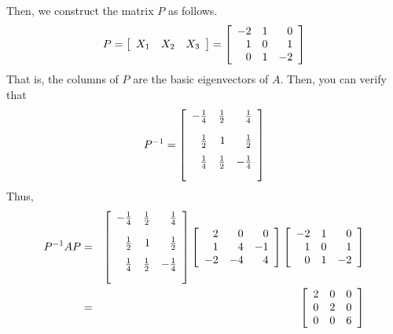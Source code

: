 \begin{solution}
Then, we construct the matrix $P$ as follows. 
\begin{equation*}
P=
\left[
\begin{array}{rrr}
X_1 & X_2 & X_3
\end{array}
\right]
=
\left[
\begin{array}{rrr}
-2 & 1 & 0 \\
1 & 0 & 1 \\
0 & 1 & -2
\end{array}
\right]
\end{equation*}
That is, the columns of $P$ are the basic  eigenvectors of $A$. Then, you can verify that
\begin{equation*}
P^{-1}=\leftB
\begin{array}{rrr}
-\vspace{0.05in}\frac{1}{4} & \vspace{0.05in}\frac{1}{2} & \vspace{0.05in}\frac{1}{4} \\
\vspace{0.05in}\frac{1}{2} & 1 & \vspace{0.05in}\frac{1}{2} \\
\vspace{0.05in}\frac{1}{4} & \vspace{0.05in}\frac{1}{2} & -\vspace{0.05in}\frac{1}{4}
\end{array}
\rightB 
\end{equation*}
Thus, 
\begin{eqnarray*}
P^{-1}AP &=&\leftB
\begin{array}{rrr}
-\vspace{0.05in}\frac{1}{4} & \vspace{0.05in}\frac{1}{2} & \vspace{0.05in}\frac{1}{4} \\
\vspace{0.05in}\frac{1}{2} & 1 & \vspace{0.05in}\frac{1}{2} \\
\vspace{0.05in}\frac{1}{4} & \vspace{0.05in}\frac{1}{2} & -\vspace{0.05in}\frac{1}{4}
\end{array}
\rightB \leftB
\begin{array}{rrr}
2 & 0 & 0 \\
1 & 4 & -1 \\
-2 & -4 & 4
\end{array}
\rightB \leftB
\begin{array}{rrr}
-2 & 1 & 0 \\
1 & 0 & 1 \\
0 & 1 & -2
\end{array}
\rightB \\
&=&\leftB
\begin{array}{rrr}
2 & 0 & 0 \\
0 & 2 & 0 \\
0 & 0 & 6
\end{array}
\rightB 
\end{eqnarray*}


\end{solution}
